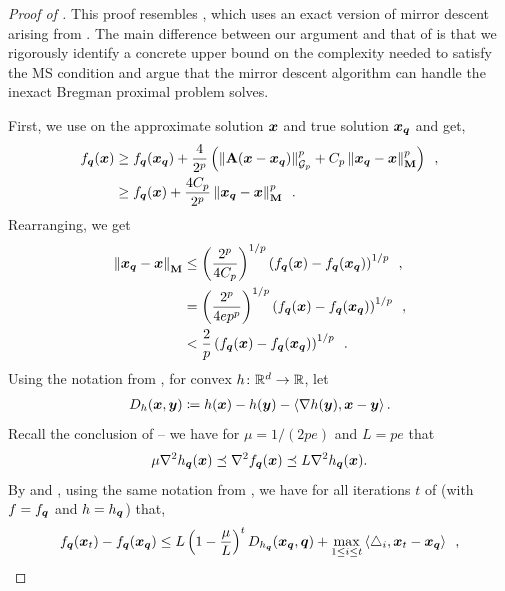 \begin{proof}[Proof of ]
This proof resembles \cite[Lemma 4.5]{jls21}, which uses an exact version of mirror descent arising from \citet{lfn18}. The main difference between our argument and that of \cite[Lemma 4.5]{jls21} is that we rigorously identify a concrete upper bound on the complexity needed to satisfy the MS condition and argue that the mirror descent algorithm can handle the inexact Bregman proximal problem solves.

First, we use  on the approximate solution $\bm{x}$ and true solution $\bm{x}_{\bm{q}}$ and get,
\begin{align*}
    f_{\bm{q}}(\bm{x}) &\ge f_{\bm{q}}(\bm{x}_{\bm{q}}) + \frac{4}{2^p}\left(\left\lVert \mathbf{A}(\bm{x}-\bm{x}_{\bm{q}}) \right\rVert_{\mathcal{G}_{p}}^p+C_p\left\lVert \bm{x}_{\bm{q}}-\bm{x} \right\rVert_{\mathbf{M}}^p\right)\enspace,\\
    &\geq f_{\bm{q}}(\bm{x}) + \frac{4C_p}{2^p}\left\lVert \bm{x}_{\bm{q}}-\bm{x} \right\rVert_{\mathbf{M}}^p\enspace.
\end{align*}
Rearranging, we get
\begin{align*}
    \left\lVert \bm{x}_{\bm{q}}-\bm{x} \right\rVert_{\mathbf{M}} &\le \left(\frac{2^p}{4C_p}\right)^{1/p}\left(f_{\bm{q}}(\bm{x})-f_{\bm{q}}(\bm{x}_{\bm{q}})\right)^{1/p}\enspace,\\
    &= \left(\frac{2^p}{4ep^p}\right)^{1/p}\left(f_{\bm{q}}(\bm{x})-f_{\bm{q}}(\bm{x}_{\bm{q}})\right)^{1/p}\enspace,\\
    &< \frac{2}{p}\left(f_{\bm{q}}(\bm{x})-f_{\bm{q}}(\bm{x}_{\bm{q}})\right)^{1/p}\enspace.
\end{align*}
Using the notation from \cite{lfn18}, for convex $h\colon\mathbb{R}^d\rightarrow\mathbb{R}$, let
\begin{align*}
    D_h(\bm{x},\bm{y}) \coloneqq h(\bm{x}) - h(\bm{y}) - \left\langle \nabla h(\bm{y}), \bm{x}-\bm{y} \right\rangle.
\end{align*}
Recall the conclusion of  -- we have for $\mu = 1/(2pe)$ and $L = pe$ that
\begin{align*}
    \mu\nabla^2 h_{\bm{q}}(\bm{x}) \preceq \nabla^2 f_{\bm{q}}(\bm{x}) \preceq L\nabla^2 h_{\bm{q}}(\bm{x}).
\end{align*}
By  and , using the same notation from , we have for all iterations $t$ of  (with $f = f_{\bm{q}}$ and $h = h_{\bm{q}}$) that,
\begin{align*}
    f_{\vq}(\vx_t) - f_{\vq}(\vx_{\vq}) &\le L\inparen{1-\frac{\mu}{L}}^tD_{h_{\vq}}(\vx_{\vq},\vq)+\max_{1\le i \le t} \ip{\triangle_i, \vx_t-\vx_{\vq}}\enspace,\\

\end{align*}
\end{proof}
